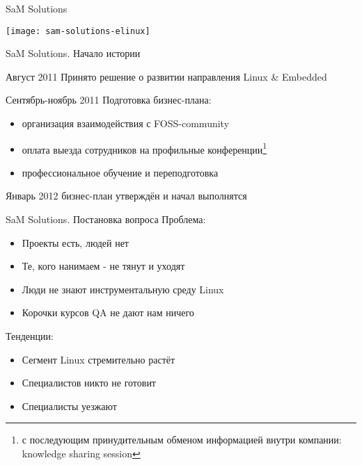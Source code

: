 \begin{frame}{SaM Solutions}
  \begin{center}
    \texttt{[image: sam-solutions-elinux]}
  \end{center}
\end{frame}

\begin{frame}{SaM Solutions. Начало истории}
  \begin{block}{Август 2011}
    Принято решение о развитии направления Linux \& Embedded
  \end{block} \pause

  \begin{block}{Сентябрь-ноябрь 2011}
    Подготовка бизнес-плана:
    \begin{itemize}
      \item организация взаимодействия с FOSS-community
      \item оплата выезда сотрудников на профильные конференции\footnote{с последующим принудительным обменом информацией внутри компании: knowledge sharing session}
      \item профессиональное обучение и переподготовка
    \end{itemize}
  \end{block} \pause

  \begin{block}{Январь 2012}
    бизнес-план утверждён и начал выполнятся
  \end{block}

\end{frame}

\begin{frame}{SaM Solutions. Постановка вопроса}
  \alert{Проблема}:
  \begin{itemize}
    \item Проекты есть, людей нет
    \item Те, кого нанимаем - не тянут и уходят
    \item Люди не знают инструментальную среду Linux
    \item Корочки курсов QA не дают нам ничего 
  \end{itemize} \pause

  \alert{Тенденции}:
  \begin{itemize}
    \item Сегмент Linux стремительно растёт
    \item Специалистов никто не готовит 
    \item Специалисты уезжают
  \end{itemize} 
    
\end{frame}

